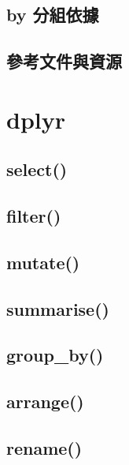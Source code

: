 \documentclass[]{book}
\begin{document}
\hypertarget{by-ux5206ux7d44ux4f9dux64da}{%
\subsection{by 分組依據}\label{by-ux5206ux7d44ux4f9dux64da}}

\hypertarget{ux53c3ux8003ux6587ux4ef6ux8207ux8cc7ux6e90}{%
\subsection{參考文件與資源}\label{ux53c3ux8003ux6587ux4ef6ux8207ux8cc7ux6e90}}

\hypertarget{dplyr}{%
\section{dplyr}\label{dplyr}}

\hypertarget{select}{%
\subsection{select()}\label{select}}

\hypertarget{filter}{%
\subsection{filter()}\label{filter}}

\hypertarget{mutate}{%
\subsection{mutate()}\label{mutate}}

\hypertarget{summarise}{%
\subsection{summarise()}\label{summarise}}

\hypertarget{group_by}{%
\subsection{group\_by()}\label{group_by}}

\hypertarget{arrange}{%
\subsection{arrange()}\label{arrange}}

\hypertarget{rename}{%
\subsection{rename()}\label{rename}}
\end{document}
